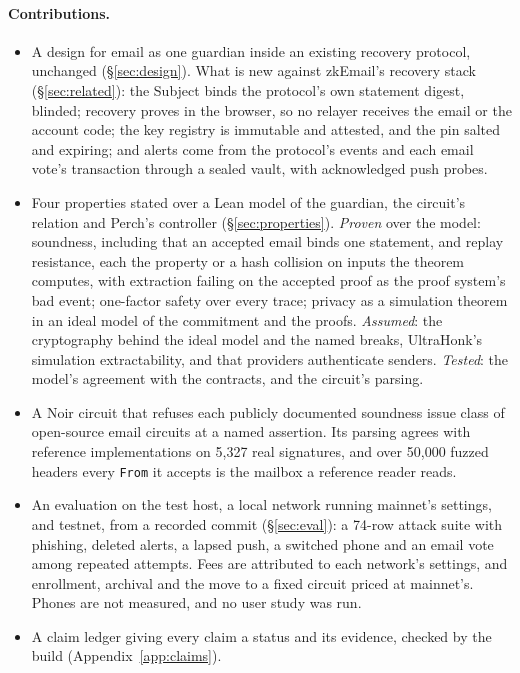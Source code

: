 \paragraph{Contributions.}
\begin{itemize}
  \item A design for email as one guardian inside an existing recovery
    protocol, unchanged (\S\ref{sec:design}). What
    is new against zkEmail's recovery stack (\S\ref{sec:related}): the
    Subject binds the protocol's own statement digest, blinded; recovery
    proves in the browser, so no relayer receives the email or the account
    code; the key registry is immutable and attested, and the pin salted and
    expiring; and alerts come from the protocol's events and each email vote's
    transaction through a sealed vault, with acknowledged push probes.
  \item Four properties stated over a Lean model of the guardian, the
    circuit's relation and Perch's controller (\S\ref{sec:properties}).
    \emph{Proven} over the model: soundness, including that an accepted
    email binds one statement, and replay resistance, each the property or a
    hash collision on inputs the theorem computes, with extraction failing on
    the accepted proof as the proof system's bad event; one-factor safety
    over every trace; privacy as a simulation theorem in an ideal model of
    the commitment and the
    proofs.
    \emph{Assumed}: the cryptography behind the ideal model and the named
    breaks, UltraHonk's simulation extractability, and that providers
    authenticate
    senders.
    \emph{Tested}: the model's agreement with the contracts, and the
    circuit's parsing.
  \item A Noir circuit that refuses each publicly documented soundness issue
    class of open-source email circuits at a named
    assertion. Its parsing agrees with reference
    implementations on 5{,}327 real signatures, and over 50{,}000 fuzzed
    headers every \texttt{From} it accepts is the mailbox a reference reader
    reads.
  \item An evaluation on the test host, a local network running mainnet's
    settings, and testnet, from a recorded commit (\S\ref{sec:eval}): a
    74-row attack suite with phishing, deleted alerts, a lapsed push, a
    switched phone and an email vote among repeated
    attempts. Fees
    are attributed to each network's settings, and enrollment, archival and
    the move to a fixed circuit priced at
    mainnet's.
    Phones are not measured, and no user study was run.
  \item A claim ledger giving every claim a status and its evidence, checked
    by the build (Appendix~\ref{app:claims}).
\end{itemize}

